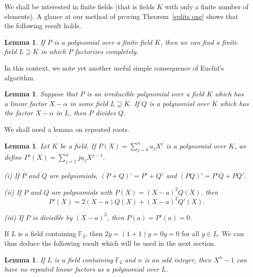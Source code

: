 \documentclass[12pt,a4paper]{article}
\theoremstyle{plain}
\newtheorem{lemma}[theorem]{Lemma}
\theoremstyle{definition}
\begin{document}
We shall be interested in finite fields (that is
fields $K$ with only a finite number of elements).
A glance at our method of proving Theorem~\ref{splits one}
shows that the following result holds.
\begin{lemma}\label{splits two}
If $P$ is a polynomial over a finite field $K$,
then we can find a finite field $L\supseteq K$
in which $P$ factorises completely.
\end{lemma}

In this context, we note yet another useful
simple consequence of Euclid's algorithm.
\begin{lemma} Suppose that
$P$ is an irreducible
polynomial over a field $K$
which has a linear factor $X-\alpha$
in some field $L\supseteq K$.
If $Q$ is a polynomial over $K$ which
has the factor $X-\alpha$ in $L$,
then $P$ divides $Q$.
\end{lemma}

We shall need a lemma on repeated roots.
\begin{lemma} Let $K$ be a field. If
$P(X)=\sum_{j=0}^{n}a_{j}X^{j}$ is a polynomial
over $K$, we define $P'(X)=\sum_{j=1}^{n}ja_{j}X^{j-1}$.

(i) If $P$ and $Q$ are polynomials, $(P+Q)'=P'+Q'$
and $(PQ)'=P'Q+PQ'$.

(ii) If $P$ and $Q$ are polynomials with
$P(X)=(X-a)^{2}Q(X)$, then
\[P'(X)=2(X-a)Q(X)+(X-a)^{2}Q'(X).\]

(iii) If $P$ is divisible by $(X-a)^{2}$, then $P(a)=P'(a)=0$.
\end{lemma}

If $L$ is a field containing ${\mathbb F}_{2}$, then
$2y=(1+1)y=0y=0$ for all $y\in L$. We can thus
deduce the following result which will be used
in the next section.
\begin{lemma}\label{no repeat}
If $L$ is a field containing ${\mathbb F}_{2}$
and $n$ is an odd integer, then
$X^{n}-1$ can have no repeated linear factors
as a polynomial over $L$.
\end{lemma}
\end{document}
